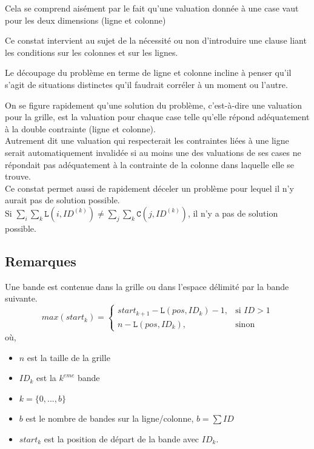 \documentclass[a4paper,12pt]{report}
\begin{document}
Cela se comprend aisément par le fait qu'une valuation donnée à une case vaut pour les deux dimensions (ligne et colonne)

Ce constat intervient au sujet de la nécessité ou non d'introduire une clause liant les conditions sur les colonnes et sur les lignes.

Le découpage du problème en terme de ligne et colonne incline à penser qu'il s'agit de situations distinctes qu'il faudrait corréler à un moment ou l'autre.

On se figure rapidement qu'une solution du problème, c'est-à-dire une valuation pour la grille, est la valuation pour chaque case telle qu'elle répond adéquatement à la double contrainte (ligne et colonne).\\

Autrement dit une valuation qui respecterait les contraintes liées à une ligne serait automatiquement invalidée si au moins une des valuations de ses cases ne répondait pas adéquatement à la contrainte de la colonne dans laquelle elle se trouve.\\

Ce constat permet aussi de rapidement déceler un problème pour lequel il n'y aurait pas de solution possible.\\
Si $\sum_i \sum_k \mathtt{L}(i,ID^{(k)}) \neq  \sum_j \sum_k \mathtt{C}(j,ID^{(k)})$, il n'y a pas de solution possible.

\subsection{Remarques}

Une bande est contenue dans la grille ou dans l'espace délimité par la bande suivante.
	$$max(start_k) =
	\begin{cases} 
		 start_{k+1}-\mathtt{L}(pos,ID_k)-1, &\text{si } ID > 1\\
		 n - \mathtt{L}(pos,ID_k), & \text{sinon}
	\end{cases}
	$$
	où,
		\begin{itemize}
		\item[] $n$ est la taille de la grille
		\item[] $ID_k$ est la $k^{eme}$ bande
		\item[] $k=\{0,...,b\}$
		\item[] $b$ est le nombre de bandes sur la ligne/colonne, $b=\sum ID$		
		\item[] $start_k$ est la position de départ de la bande avec $ID_k$.\\
		\end{itemize}
\end{document}
